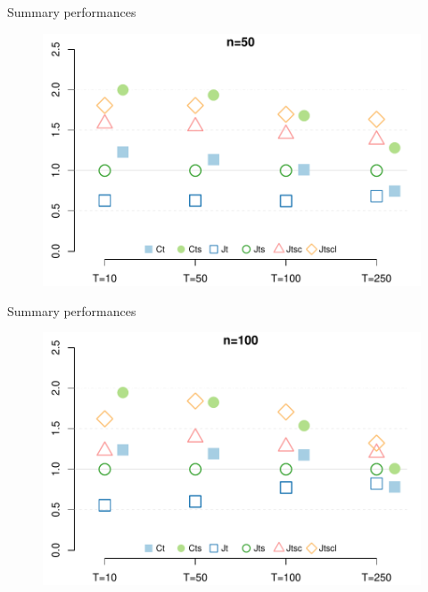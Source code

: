 \documentclass[
	11pt, %
 xcolor={dvipsnames,svgnames}
]{beamer}
\begin{document}
\begin{frame}{Summary performances}
   \begin{figure}
        \centering
        \includegraphics[width=0.88\linewidth]{Testing/Scaling possibilities/summary_performance_n50.pdf}
        \label{fig:enter-label}
    \end{figure} 
\end{frame}
\begin{frame}{Summary performances}
   \begin{figure}
        \centering
        \includegraphics[width=0.88\linewidth]{Testing/Scaling possibilities/summary_performance_n100.pdf}
        \label{fig:enter-label}
    \end{figure} 
\end{frame}
\end{document}
